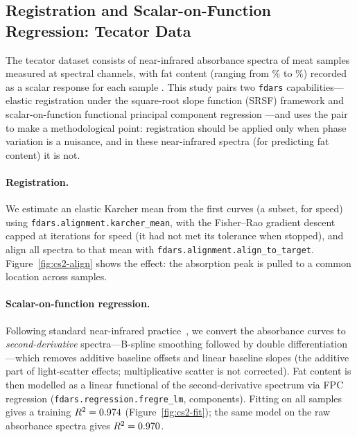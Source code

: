 

\subsection{Registration and Scalar-on-Function Regression: Tecator Data}
\label{subsec:cs2-tecator}

The tecator dataset consists of \csTwoNSamples{} near-infrared absorbance spectra of meat
samples measured at \csTwoNChannels{} spectral channels, with fat content (ranging from
\csTwoFatMin\% to \csTwoFatMax\%) recorded as a scalar response for each sample
\citep{borggaard_thodberg_1992}.  This study pairs two \texttt{fdars}
capabilities---elastic registration under the square-root slope function
(SRSF) framework \citep{srivastava_klassen_2016} and scalar-on-function
functional principal component regression \citep{reiss_ogden_2007}---and uses
the pair to make a methodological point: registration should be applied only
when phase variation is a nuisance, and in these near-infrared spectra (for
predicting fat content) it is not.

\paragraph{Registration.}
We estimate an elastic Karcher mean from the first \csTwoNKarcher{} curves (a subset, for speed)
using \texttt{fdars.alignment.karcher\_mean}, with the Fisher--Rao gradient
descent capped at \csTwoKarcherIter{} iterations for speed (it had not met its tolerance when
stopped), and align all \csTwoNSamples{} spectra to that mean with
\texttt{fdars.alignment.align\_to\_target}.  Figure~\ref{fig:cs2-align} shows
the effect: the absorption peak is pulled to a common location across samples.

\paragraph{Scalar-on-function regression.}
Following standard near-infrared practice~\citep{rinnan_2009}, we convert the absorbance curves to
\emph{second-derivative} spectra---B-spline smoothing followed by double
differentiation---which removes additive baseline offsets and linear baseline
slopes (the additive part of light-scatter effects; multiplicative scatter is
not corrected).  Fat content is
then modelled as a linear functional of the second-derivative spectrum via FPC
regression (\texttt{fdars.regression.fregre\_lm}, \csTwoNComp{} components).
Fitting on all \csTwoNSamples{} samples gives a training $R^2 = 0.974$
(Figure~\ref{fig:cs2-fit}); the same model on the raw absorbance spectra gives
$R^2 = 0.970$.

